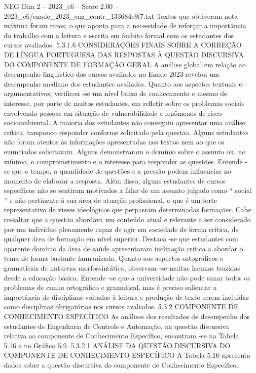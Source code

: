\begin{textsample}{NEG Dim 2 – 2023\_c6 – Score 2.00 – 2023\_c6/enade\_2023\_eng\_contr\_133684c9f7.txt}
Textos que obtiveram nota máxima foram raros, o que aponta para a necessidade de reforçar a importância do trabalho com a leitura e escrita em âmbito formal com os estudantes dos cursos avaliados. 5.3.1.6 CONSIDERAÇÕES FINAIS SOBRE A CORREÇÃO DE LÍNGUA PORTUGUESA DAS RESPOSTAS À QUESTÃO DISCURSIVA DO COMPONENTE DE FORMAÇÃO GERAL A análise global em relação ao desempenho linguístico dos cursos avaliados no Enade 2023 revelou um desempenho mediano dos estudantes avaliados.
Quanto aos aspectos textuais e argumentativos, verificou -se um nível baixo de conhecimento e mesmo de interesse, por parte de muitos estudantes, em refletir sobre os problemas sociais envolvendo pessoas em situação de vulnerabilidade e fenômenos de risco socioambiental.
A maioria dos estudantes não conseguiu apresentar uma análise crítica, tampouco responder conforme solicitado pela questão.
Alguns estudantes não foram atentos às informações apresentadas nos textos nem ao que os enunciados solicitavam.
Alguns demonstraram o domínio sobre o assunto ou, no mínimo, o comprometimento e o interesse para responder as questões.
Entende -se que o tempo, a quantidade de questões e a pressão podem influenciar no momento de elaborar a resposta.
Além disso, alguns estudantes de cursos específicos não se sentiram motivados a falar de um assunto julgado como “ social ” e não pertinente à sua área de atuação profissional, o que é um forte representativo de vieses ideológicos que perpassam determinadas formações.
Cabe ressaltar que a questão abordava um conteúdo atual e relevante a ser considerado por um indivíduo plenamente capaz de agir em sociedade de forma crítica, de qualquer área de formação em nível superior.
Destaca -se que estudantes com aparente domínio da área de saúde apresentaram inclinação crítica a abordar o tema de forma bastante humanizada.
Quanto aos aspectos ortográficos e gramaticais de natureza morfossintática, observam -se muitas lacunas trazidas desde a educação básica.
Entende -se que a universidade não pode sanar todos os problemas de cunho ortográfico e gramatical, mas é preciso salientar a importância de disciplinas voltadas à leitura e produção de texto serem incluídas como disciplinas obrigatórias nos cursos avaliados. 5.3.2 COMPONENTE DE CONHECIMENTO ESPECÍFICO As análises dos resultados de desempenho dos estudantes de Engenharia de Controle e Automação, na questão discursiva relativa ao componente de Conhecimento Específico, encontram -se na Tabela 5.16 e no Gráfico 5.9. 5.3.2.1 ANÁLISE DA QUESTÃO DISCURSIVA DO COMPONENTE DE CONHECIMENTO ESPECÍFICO A Tabela 5.16 apresenta dados sobre a questão discursiva do componente de Conhecimento Específico.

\end{textsample}
